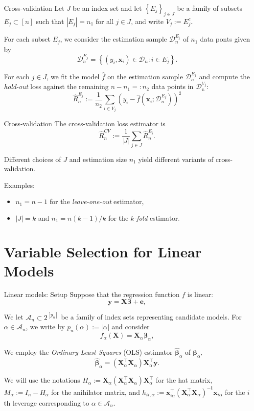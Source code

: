 \documentclass{beamer}
\newcommand{\0}{\emptyset}
\newcommand{\paren}[1]{\left(#1 \right)}
\newcommand{\set}[1]{\left\{ #1 \right\}}
\newcommand{\data}{\mathcal{D}_{n}}
\newcommand{\Acal}{\mathcal{A}_{n}}
\newcommand{\X}{\boldsymbol{X}}
\newcommand{\x}{\boldsymbol{x}}
\newcommand{\y}{\boldsymbol{y}}
\newcommand{\e}{\boldsymbol{e}}
\newcommand{\bbeta}{\boldsymbol{\beta}}
\newcommand{\bbetahat}{\boldsymbol{\hat{\beta}}}
\newcommand{\ols}[1]{\paren{\X^{\top}_{#1}\X_{#1}}\X^{\top}_{#1}\y}
\newcommand{\1}{\mathmybb{1}}
\begin{document}
\begin{frame}{Cross-validation}  
  Let \(J\) be an index set and let \(\set{E_{j}}_{j\in J}\) be a family of subsets \(E_{j}\subset [n]\) such that \(|E_{j}|=n_{1}\) for all \(j\in J\), and write \(V_{j} := E_{j}^{c}\). 
  
  For each subset \(E_{j}\), we consider the estimation sample \(\data^{E_{j}}\) of \(n_{1}\) data ponts given by
  \[\data^{E_{j}} = \set{\paren{y_{i}, \x_{i}}\in\data :i\in E_{j}}.\]

  For each \(j\in J\), we fit the model \(\hat{f}\) on the estimation sample \(\data^{E_{j}}\) and compute the \alert{\emph{hold-out}} loss against the remaining \(n-n_{1}=: n_{2}\) data points in \(\data^{V_{j}}\):
  \[\hat{R}_{n}^{E_{j}} := \frac{1}{n_{2}}\sum_{i \in V_{j}} \paren{y_{i} - \hat{f}\paren{\x_{i};\data^{E_{j}}}}^{2}\]
\end{frame}

\begin{frame}{Cross-validation}
  The cross-validation loss estimator is
  \[\hat{R}^{CV}_{n}:= \frac{1}{|J|}\sum_{j\in J}\hat{R}_{n}^{E_{j}}.\]

  Different choices of  \(J\) and estimation size \(n_{1}\) yield different variants of cross-validation.
  
  Examples:
  \begin{itemize}
    \item \(n_{1}=n-1\) for the \emph{leave-one-out} estimator,
    \item \(|J|=k\) and \(n_{1} = n(k-1)/k\) for the \emph{\(k\)-fold} estimator.
  \end{itemize}

\end{frame}

\section{Variable Selection for Linear Models}
\begin{frame}{Linear models: Setup}
  Suppose that the regression function \(f\) is \alert{linear}:
  \[\y = \X\bbeta + \e,\]

  We let \(\Acal\subset2^{[p_{n}]}\) be a family of index sets representing candidate models. For \(\alpha\in\Acal\), we write by \(p_{n}(\alpha) := |\alpha|\) and consider
  \[f_{\alpha}(\X) = \X_{\alpha}\bbeta_{\alpha},\]

  We employ the \emph{Ordinary Least Squares} (OLS) estimator \(\bbetahat_{\alpha}\) of \(\bbeta_{\alpha}\),
  \[\bbetahat_{\alpha} = \ols{\alpha}.\]

  We will use the notations \alert{\(H_{\alpha} := \X_{\alpha}\paren{\X_{\alpha}^{\top}\X_{\alpha}}\X_{\alpha}^{\top}\)} for the hat matrix, \alert{\(M_{\alpha}:=I_{n}-H_{\alpha}\)} for the anihilator matrix, and \alert{\(h_{ii,\alpha}:=\x_{i\alpha}^{\top}{(\X_{\alpha}^{\top}\X_{\alpha})}^{-1}\x_{i\alpha}\)} for the \(i\)th leverage corresponding to \(\alpha\in\Acal\).
\end{frame}
\end{document}
